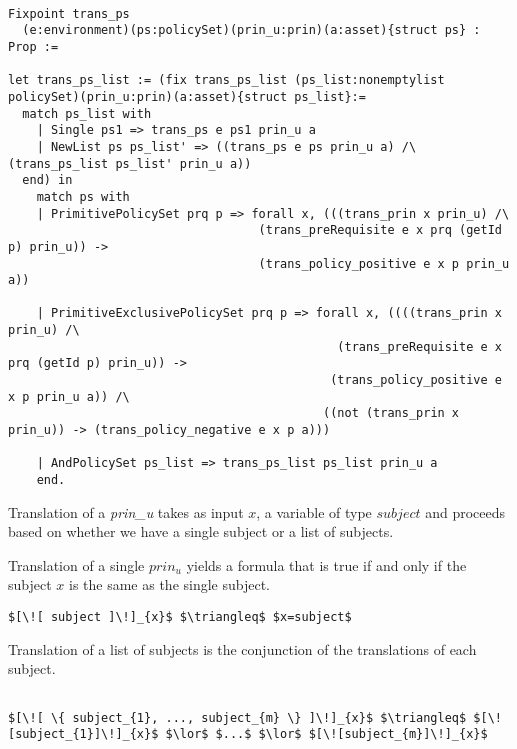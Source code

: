 \begin{minipage}{\linewidth}
\begin{lstlisting}

Fixpoint trans_ps
  (e:environment)(ps:policySet)(prin_u:prin)(a:asset){struct ps} : Prop :=

let trans_ps_list := (fix trans_ps_list (ps_list:nonemptylist policySet)(prin_u:prin)(a:asset){struct ps_list}:=
  match ps_list with
    | Single ps1 => trans_ps e ps1 prin_u a
    | NewList ps ps_list' => ((trans_ps e ps prin_u a) /\ (trans_ps_list ps_list' prin_u a))
  end) in
    match ps with
    | PrimitivePolicySet prq p => forall x, (((trans_prin x prin_u) /\ 
                                   (trans_preRequisite e x prq (getId p) prin_u)) -> 
                                   (trans_policy_positive e x p prin_u a))  

    | PrimitiveExclusivePolicySet prq p => forall x, ((((trans_prin x prin_u) /\ 
                                              (trans_preRequisite e x prq (getId p) prin_u)) -> 
                                             (trans_policy_positive e x p prin_u a)) /\
                                            ((not (trans_prin x prin_u)) -> (trans_policy_negative e x p a)))
                   
    | AndPolicySet ps_list => trans_ps_list ps_list prin_u a
    end.
\end{lstlisting}
\end{minipage}

Translation of a \emph{prin_{u}} takes as input $x$, a variable of type $subject$ and proceeds based on whether we have a single subject or a list of subjects.  

Translation of a single $prin_{u}$ yields a formula that is true if and only if the subject $x$ is the same as the single subject.

\lstset{mathescape, language=AST}  
\begin{lstlisting}[frame=single, caption={Prin Translation {$\colon$} Single subject},label={lst:transprinSingle}]
$[\![ subject ]\!]_{x}$ $\triangleq$ $x=subject$
\end{lstlisting}


Translation of a list of subjects is the conjunction of the translations of each subject.

\lstset{mathescape, language=AST}  
\begin{lstlisting}[frame=single, caption={Prin Translation {$\colon$} List of subjects},label={lst:transprinListOfSubjects}]

$[\![ \{ subject_{1}, ..., subject_{m} \} ]\!]_{x}$ $\triangleq$ $[\![subject_{1}]\!]_{x}$ $\lor$ $...$ $\lor$ $[\![subject_{m}]\!]_{x}$

\end{lstlisting}

